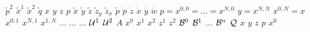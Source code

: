 \documentclass[oneside]{book}
\begin{document}
$\tilde p^2$%
\stopmpxshipout
\mpxshipout%
$\tilde x^1$%
\stopmpxshipout
\mpxshipout%
$\tilde x^2$%
\stopmpxshipout
\mpxshipout%
$\tilde q$%
\stopmpxshipout
\mpxshipout%
$x$%
\stopmpxshipout
\mpxshipout%
$y$%
\stopmpxshipout
\mpxshipout%
$z$%
\stopmpxshipout
\mpxshipout%
$p$%
\stopmpxshipout
\mpxshipout%
$\tilde x$%
\stopmpxshipout
\mpxshipout%
$\tilde y$%
\stopmpxshipout
\mpxshipout%
$\tilde z$%
\stopmpxshipout
\mpxshipout%
$\tilde z_y$%
\stopmpxshipout
\mpxshipout%
$\tilde z_x$%
\stopmpxshipout
\mpxshipout%
$\tilde p$%
\stopmpxshipout
\mpxshipout%
$\dot p$%
\stopmpxshipout
\mpxshipout%
$\dot z$%
\stopmpxshipout
\mpxshipout%
$\dot x$%
\stopmpxshipout
\mpxshipout%
$\dot y$%
\stopmpxshipout
\mpxshipout%
$\dot w$%
\stopmpxshipout
\mpxshipout%
$p=x^{0,0}=\dots=x^{N,0}$%
\stopmpxshipout
\mpxshipout%
$y=x^{N,N}$%
\stopmpxshipout
\mpxshipout%
$x^{0,N}=x$%
\stopmpxshipout
\mpxshipout%
$x^{0,1}$%
\stopmpxshipout
\mpxshipout%
$x^{N,1}$%
\stopmpxshipout
\mpxshipout%
$x^{1,N}$%
\stopmpxshipout
\mpxshipout%
$\dots$%
\stopmpxshipout
\mpxshipout%
$\dots$%
\stopmpxshipout
\mpxshipout%
$\dots$%
\stopmpxshipout
\mpxshipout%
$\mathcal{U}^1$%
\stopmpxshipout
\mpxshipout%
$\mathcal{U}^2$%
\stopmpxshipout
\mpxshipout%
$A$%
\stopmpxshipout
\mpxshipout%
$x^0$%
\stopmpxshipout
\mpxshipout%
$x^1$%
\stopmpxshipout
\mpxshipout%
$x^2$%
\stopmpxshipout
\mpxshipout%
$z^1$%
\stopmpxshipout
\mpxshipout%
$z^2$%
\stopmpxshipout
\mpxshipout%
$\mathcal{B}^0$%
\stopmpxshipout
\mpxshipout%
$\mathcal{B}^1$%
\stopmpxshipout
\mpxshipout%
$\dots$%
\stopmpxshipout
\mpxshipout%
$\mathcal{B}^n$%
\stopmpxshipout
\mpxshipout%
$\mathcal{Q}$%
\stopmpxshipout
\mpxshipout%
$x$%
\stopmpxshipout
\mpxshipout%
$y$%
\stopmpxshipout
\mpxshipout%
$z$%
\stopmpxshipout
\mpxshipout%
$p$%
\stopmpxshipout
\mpxshipout%
$x^0$%
\stopmpxshipout
\mpxshipout%
\end{document}
